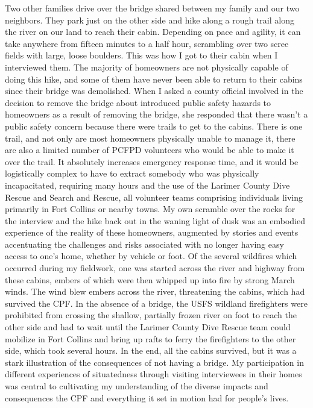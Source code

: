 \documentclass[
]{article}
\begin{document}
Two other families drive over the bridge shared between my family and our two neighbors. They park just on the other side and hike along a rough trail along the river on our land to reach their cabin. Depending on pace and agility, it can take anywhere from fifteen minutes to a half hour, scrambling over two scree fields with large, loose boulders. This was how I got to their cabin when I interviewed them. The majority of homeowners are not physically capable of doing this hike, and some of them have never been able to return to their cabins since their bridge was demolished. When I asked a county official involved in the decision to remove the bridge about introduced public safety hazards to homeowners as a result of removing the bridge, she responded that there wasn't a public safety concern because there were trails to get to the cabins. There is one trail, and not only are most homeowners physically unable to manage it, there are also a limited number of PCFPD volunteers who would be able to make it over the trail. It absolutely increases emergency response time, and it would be logistically complex to have to extract somebody who was physically incapacitated, requiring many hours and the use of the Larimer County Dive Rescue and Search and Rescue, all volunteer teams comprising individuals living primarily in Fort Collins or nearby towns. My own scramble over the rocks for the interview and the hike back out in the waning light of dusk was an embodied experience of the reality of these homeowners, augmented by stories and events accentuating the challenges and risks associated with no longer having easy access to one's home, whether by vehicle or foot. Of the several wildfires which occurred during my fieldwork, one was started across the river and highway from these cabins, embers of which were then whipped up into fire by strong March winds. The wind blew embers across the river, threatening the cabins, which had survived the CPF. In the absence of a bridge, the USFS wildland firefighters were prohibited from crossing the shallow, partially frozen river on foot to reach the other side and had to wait until the Larimer County Dive Rescue team could mobilize in Fort Collins and bring up rafts to ferry the firefighters to the other side, which took several hours. In the end, all the cabins survived, but it was a stark illustration of the consequences of not having a bridge. My participation in different experiences of situatedness through visiting interviewees in their homes was central to cultivating my understanding of the diverse impacts and consequences the CPF and everything it set in motion had for people's lives.
\end{document}
